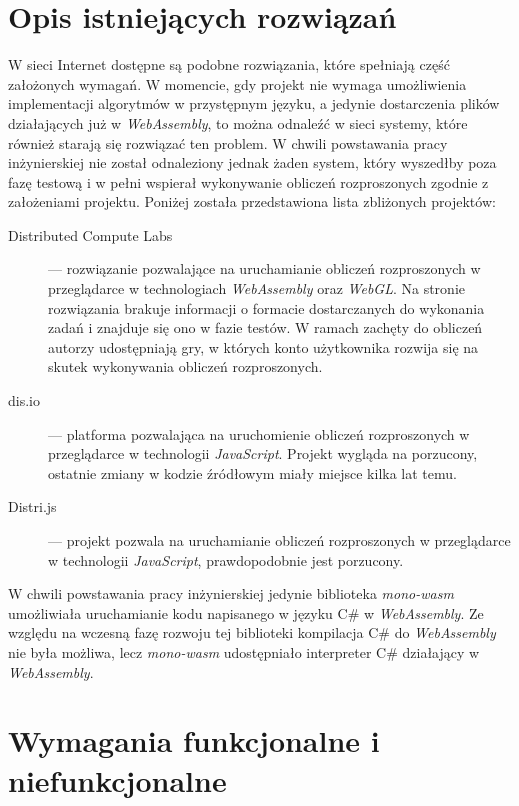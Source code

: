 \documentclass[a4paper,11pt,twoside]{report}
\theoremstyle{definition}
\begin{document}
    \section{Opis istniejących rozwiązań}
        W sieci Internet dostępne są podobne rozwiązania, które spełniają część założonych wymagań.
        W momencie, gdy projekt nie wymaga umożliwienia implementacji algorytmów w przystępnym języku, a jedynie dostarczenia plików działających już w \textit{WebAssembly}, to można odnaleźć w sieci systemy, które również starają się rozwiązać ten problem.
        W chwili powstawania pracy inżynierskiej nie został odnaleziony jednak żaden system, który wyszedłby poza fazę testową i w pełni wspierał wykonywanie obliczeń rozproszonych zgodnie z założeniami projektu. Poniżej została przedstawiona lista zbliżonych projektów:
        
        \begin{description}
            \item[Distributed Compute Labs~\cite{distributed-compute-labs}] --- rozwiązanie pozwalające na uruchamianie obliczeń rozproszonych w przeglądarce w technologiach \textit{WebAssembly} oraz \textit{WebGL}. Na stronie rozwiązania brakuje informacji o formacie dostarczanych do wykonania zadań i znajduje się ono w fazie testów. W ramach zachęty do obliczeń autorzy udostępniają gry, w których konto użytkownika rozwija się na skutek wykonywania obliczeń rozproszonych.
            \item[dis.io~\cite{dis-io}] --- platforma pozwalająca na uruchomienie obliczeń rozproszonych w przeglądarce w technologii \textit{JavaScript}. Projekt wygląda na porzucony, ostatnie zmiany w kodzie źródłowym miały miejsce kilka lat temu.
            \item[Distri.js~\cite{distri-js}] --- projekt pozwala na uruchamianie obliczeń rozproszonych w przeglądarce w technologii \textit{JavaScript}, prawdopodobnie jest porzucony.
        \end{description}
        
        
        W chwili powstawania pracy inżynierskiej jedynie biblioteka \textit{mono-wasm} umożliwiała uruchamianie kodu napisanego w języku C\# w \textit{WebAssembly}.
        Ze względu na wczesną fazę rozwoju tej biblioteki kompilacja C\# do \textit{WebAssembly} nie była możliwa, lecz \textit{mono-wasm} udostępniało interpreter C\# działający w \textit{WebAssembly}.
        
		\section{Wymagania funkcjonalne i niefunkcjonalne}
                
\end{document}
